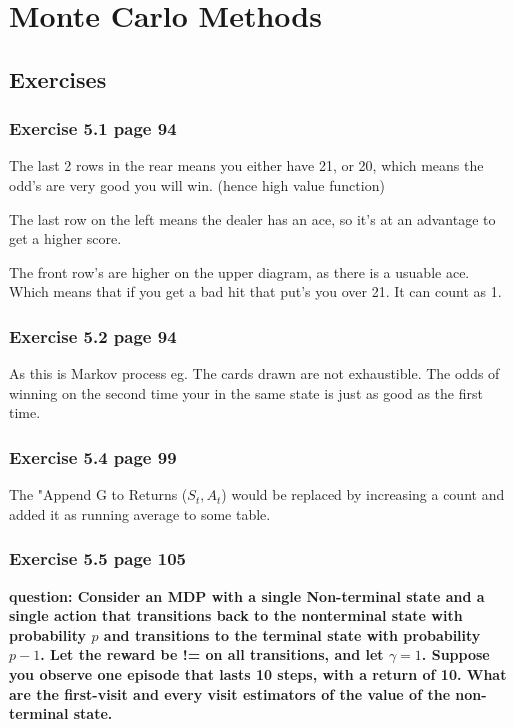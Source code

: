 \chapter{Monte Carlo Methods}

\section{Exercises}

\subsection{Exercise 5.1 page 94}
The last 2 rows in the rear means you either have 21, or 20, which means the odd's are very good you will win. (hence high value function)

The last row on the left means the dealer has an ace, so it's at an advantage to get a higher score.

The front row's are higher on the upper diagram, as there is a usuable ace. Which means that if you get a bad hit that put's you over 21. It can count as 1.

\subsection{Exercise 5.2 page 94}
As this is Markov process eg. The cards drawn are not exhaustible. The odds of winning on the second time your in the same state is just as good as the first time.

\subsection{Exercise 5.4 page 99}
The "Append G to Returns ($S_{t} , A_{t}$) would be replaced by increasing a count and added it as running average to some table.

\subsection{Exercise 5.5 page 105}
\textbf{question: Consider an MDP with a single Non-terminal state and a single action that transitions back to the nonterminal state with probability $p$ and transitions to the terminal state with probability $p-1$. Let the reward be != on all transitions, and let $\gamma = 1$. Suppose you observe one episode that lasts 10 steps, with a return of 10. What are the first-visit and every visit estimators of the value of the non-terminal state. }

